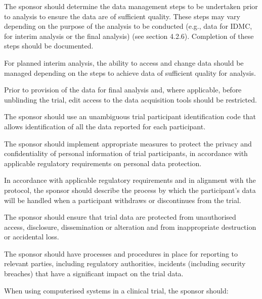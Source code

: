 \documentclass[11pt]{article}
\begin{document}
\begin{description}[leftmargin=2.5cm,style=sameline]
\item[(p)] The sponsor should determine the data management steps to be undertaken prior to analysis to ensure the data are of sufficient quality. These steps may vary depending on the purpose of the analysis to be conducted (e.g., data for IDMC, for interim analysis or the final analysis) (see section 4.2.6). Completion of these steps should be documented.

\item[(q)] For planned interim analysis, the ability to access and change data should be managed depending on the steps to achieve data of sufficient quality for analysis.

\item[(r)] Prior to provision of the data for final analysis and, where applicable, before unblinding the trial, edit access to the data acquisition tools should be restricted.

\item[(s)] The sponsor should use an unambiguous trial participant identification code that allows identification of all the data reported for each participant.

\item[(t)] The sponsor should implement appropriate measures to protect the privacy and confidentiality of personal information of trial participants, in accordance with applicable regulatory requirements on personal data protection.

\item[(u)] In accordance with applicable regulatory requirements and in alignment with the protocol, the sponsor should describe the process by which the participant's data will be handled when a participant withdraws or discontinues from the trial.

\item[(v)] The sponsor should ensure that trial data are protected from unauthorised access, disclosure, dissemination or alteration and from inappropriate destruction or accidental loss.

\item[(w)] The sponsor should have processes and procedures in place for reporting to relevant parties, including regulatory authorities, incidents (including security breaches) that have a significant impact on the trial data.

\item[(x)] When using computerised systems in a clinical trial, the sponsor should:

\end{description}
\end{document}
